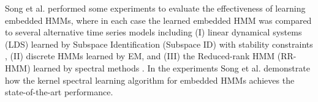 Song et al.\cite{ref20} performed some experiments to evaluate the effectiveness
of learning embedded HMMs, where in each case the learned embedded HMM was compared to several alternative
time series models including (I) linear dynamical
systems (LDS) learned by Subspace Identification
(Subspace ID)\cite{ref13} with
stability constraints \cite{ref25}, (II) discrete
HMMs learned by EM, and (III) the Reduced-rank
HMM (RR-HMM) learned by spectral methods \cite{ref7}. In the experiments Song et al.\cite{ref20} demonstrate how
the kernel spectral learning algorithm for embedded
HMMs achieves the state-of-the-art performance.
